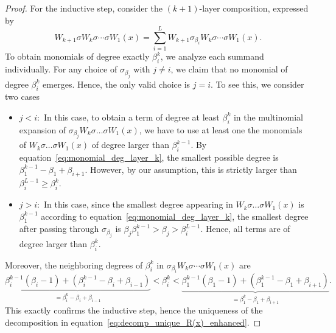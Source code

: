 \documentclass{article} %
\def\eqref#1{equation~\ref{#1}}
\theoremstyle{plain}%
\theoremstyle{definition}
\theoremstyle{remark}
\begin{document}
\begin{proof}
For the inductive step, consider the $(k+1)$-layer composition, expressed by
\begin{equation}
\label{eq:last_layer_expansion}
W_{k+1}\sigma W_k\sigma \cdots \sigma W_1(x)= \sum_{i=1}^{L} W_{k+1}\sigma_{\beta_i} W_k \sigma \cdots \sigma W_1(x).
\end{equation}
To obtain monomials of degree exactly $\beta_i^k$, we analyze each summand individually. For any choice of $\sigma_{\beta_j}$ with $j \neq i$, we claim that no monomial of degree $\beta_i^k$ emerges. Hence, the only valid choice is $j = i$. To see this, we consider two cases
\begin{itemize}
    \item $j<i:$ In this case, to obtain a term of degree at least $\beta_i^k$ in the multinomial expansion of $\sigma_{\beta_j} W_k \sigma \ldots \sigma W_1(x)$, we have to use at least one the monomials of $W_k \sigma \ldots \sigma W_1(x)$ of degree larger than $\beta_i^{k-1}$. By  \eqref{eq:monomial_deg_layer_k}, the smallest possible degree is $\beta_1^{k-1}-\beta_1+\beta_{i+1}$. However, by our assumption, this is strictly larger than  $\beta_{i}^{L-1} \geq \beta_{i}^{k}$.
    \item $j>i:$ In this case, since the smallest degree appearing in $W_k \sigma \ldots \sigma W_1(x)$ is $\beta_1^{k-1}$ according to \eqref{eq:monomial_deg_layer_k}, the smallest degree after passing through $\sigma_{\beta_j}$ is $\beta_j \beta_{1}^{k-1}>\beta_{j}>\beta_i^{L-1}$. Hence,  all terms are of degree larger than $\beta_i^k$.
\end{itemize}


Moreover, the neighboring degrees of $\beta_i^k$ in $\sigma_{\beta_i} W_k \sigma \cdots \sigma W_1(x)$ are
\begin{equation}    
\underbrace{\beta_i^{k-1}(\beta_i - 1) + (\beta_i^{k-1} - \beta_i + \beta_{i-1})}_{= \beta_i^k - \beta_i + \beta_{i-1}}
< \beta_i^k <
\underbrace{\beta_1^{k-1}(\beta_1 - 1) + (\beta_1^{k-1} - \beta_1 + \beta_{i+1})}_{= \beta_1^k - \beta_1 + \beta_{i+1}}.
\end{equation}    
This exactly confirms the inductive step, hence the uniqueness of the decomposition in \eqref{eq:decomp_unique_R(x)_enhanced}.
\end{proof}
\end{document}
